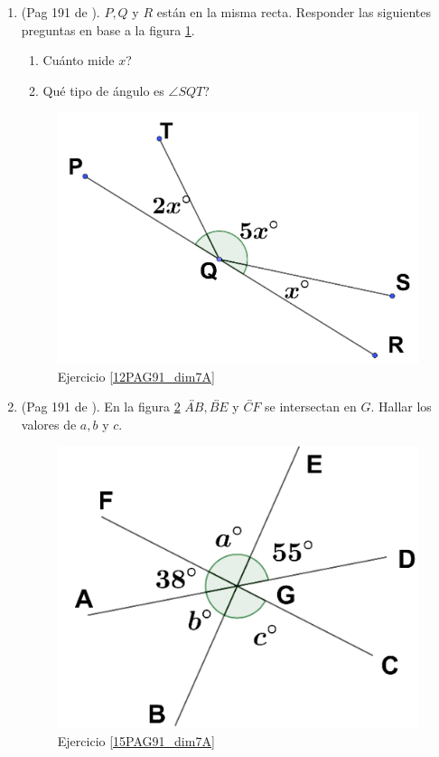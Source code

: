 \begin{enumerate}
	\item \label{12PAG91_dim7A}(Pag 191 de \cite{Dimensions_Math_7A}). $P,Q$ y $R$ están en la misma recta. Responder las siguientes preguntas en base a la figura \ref{dimensions_7A_p191_12}.
	\begin{enumerate}[label=\Alph*) ]
		\item Cuánto mide $x$?
		\item Qué tipo de ángulo es $\angle SQT$?
	\end{enumerate}	
	\begin{figure}[H]
		\centering
		\includegraphics[width=0.35\linewidth]{Geometria/imgs/dimensions_7A_p191_12}
		\caption{Ejercicio \ref{12PAG91_dim7A}}
		\label{dimensions_7A_p191_12}
	\end{figure}
	\item \label{15PAG91_dim7A}(Pag 191 de \cite{Dimensions_Math_7A}). En la figura \ref{dimensions_7A_p191_15} $\overleftrightarrow{AB},\overleftrightarrow{BE}$ y $\overleftrightarrow{CF}$ se intersectan en $G$. Hallar los valores de $a,b$ y $c$.
	\begin{figure}[H]
		\centering
		\includegraphics[width=0.3\linewidth]{Geometria/imgs/dimensions_7A_p191_15}
		\caption{Ejercicio \ref{15PAG91_dim7A}}
		\label{dimensions_7A_p191_15}
	\end{figure}
	

\end{enumerate}
